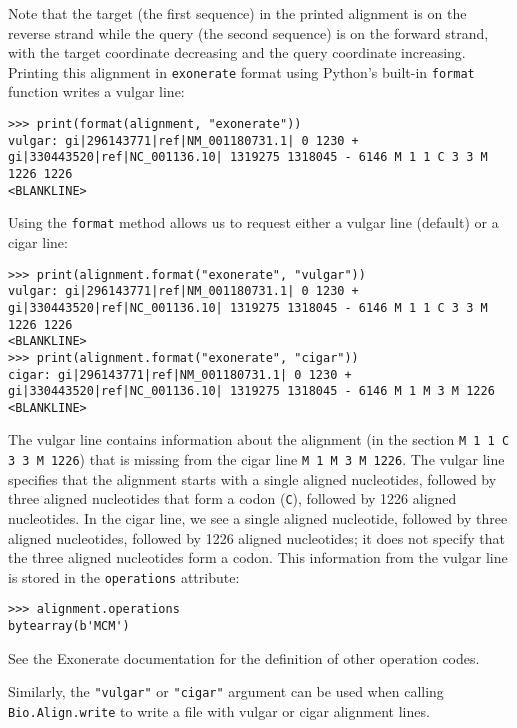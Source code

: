 Note that the target (the first sequence) in the printed alignment is on the reverse strand while the query (the second sequence) is on the forward strand, with the target coordinate decreasing and the query coordinate increasing.
Printing this alignment in \verb|exonerate| format using Python's built-in \verb|format| function writes a vulgar line:
\begin{verbatim}
>>> print(format(alignment, "exonerate"))
vulgar: gi|296143771|ref|NM_001180731.1| 0 1230 + gi|330443520|ref|NC_001136.10| 1319275 1318045 - 6146 M 1 1 C 3 3 M 1226 1226
<BLANKLINE>
\end{verbatim}
Using the \verb|format| method allows us to request either a vulgar line (default) or a cigar line:
\begin{verbatim}
>>> print(alignment.format("exonerate", "vulgar"))
vulgar: gi|296143771|ref|NM_001180731.1| 0 1230 + gi|330443520|ref|NC_001136.10| 1319275 1318045 - 6146 M 1 1 C 3 3 M 1226 1226
<BLANKLINE>
>>> print(alignment.format("exonerate", "cigar"))
cigar: gi|296143771|ref|NM_001180731.1| 0 1230 + gi|330443520|ref|NC_001136.10| 1319275 1318045 - 6146 M 1 M 3 M 1226
<BLANKLINE>
\end{verbatim}
The vulgar line contains information about the alignment (in the section \verb|M 1 1 C 3 3 M 1226|) that is missing from the cigar line \verb|M 1 M 3 M 1226|. The vulgar line specifies that the alignment starts with a single aligned nucleotides, followed by three aligned nucleotides that form a codon (\verb|C|), followed by 1226 aligned nucleotides. In the cigar line, we see a single aligned nucleotide, followed by three aligned nucleotides, followed by 1226 aligned nucleotides; it does not specify that the three aligned nucleotides form a codon. This information from the vulgar line is stored in the \verb|operations| attribute:
\begin{verbatim}
>>> alignment.operations
bytearray(b'MCM')
\end{verbatim}
See the Exonerate documentation for the definition of other operation codes.

Similarly, the \verb|"vulgar"| or \verb|"cigar"| argument can be used when calling \verb|Bio.Align.write| to write a file with vulgar or cigar alignment lines.

